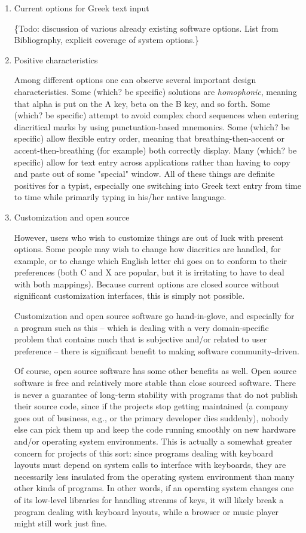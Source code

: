 \documentclass[11pt]{article}
\begin{document}
\begin{enumerate}
\item Current options for Greek text input
\label{sec:orgab45c37}

\{Todo: discussion of various already existing software options. List from Bibliography, explicit coverage of system options.\}

\item Positive characteristics
\label{sec:org4e08f4c}

Among different options one can observe several important design characteristics. Some (which? be specific) solutions are \emph{homophonic}, meaning that alpha is put on the A key, beta on the B key, and so forth. Some (which? be specific) attempt to avoid complex chord sequences when entering diacritical marks by using punctuation-based mnemonics. Some (which? be specific) allow flexible entry order, meaning that breathing-then-accent or accent-then-breathing (for example) both correctly display. Many (which? be specific) allow for text entry across applications rather than having to copy and paste out of some "special" window. All of these things are definite positives for a typist, especially one switching into Greek text entry from time to time while primarily typing in his/her native language.

\item Customization and open source
\label{sec:org80581af}

However, users who wish to customize things are out of luck with present options. Some people may wish to change how diacritics are handled, for example, or to change which English letter chi goes on to conform to their preferences (both C and X are popular, but it is irritating to have to deal with both mappings). Because current options are closed source without significant customization interfaces, this is simply not possible.

Customization and open source software go hand-in-glove, and especially for a program such as this -- which is dealing with a very domain-specific problem that contains much that is subjective and/or related to user preference -- there is significant benefit to making software community-driven. 

Of course, open source software has some other benefits as well. Open source software is free and relatively more stable than close sourced software. There is never a guarantee of long-term stability with programs that do not publish their source code, since if the projects stop getting maintained (a company goes out of business, e.g., or the primary developer dies suddenly), nobody else can pick them up and keep the code running smoothly on new hardware and/or operating system environments. This is actually a somewhat greater concern for projects of this sort: since programs dealing with keyboard layouts must depend on system calls to interface with keyboards, they are necessarily less insulated from the operating system environment than many other kinds of programs. In other words, if an operating system changes one of its low-level libraries for handling streams of keys, it will likely break a program dealing with keyboard layouts, while a browser or music player might still work just fine.


\end{enumerate}
\end{document}
